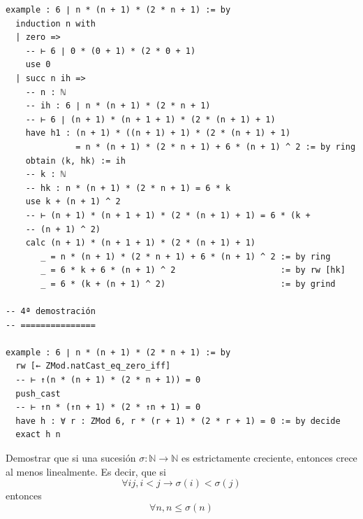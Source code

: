 \begin{verbatim}
example : 6 ∣ n * (n + 1) * (2 * n + 1) := by
  induction n with
  | zero =>
    -- ⊢ 6 ∣ 0 * (0 + 1) * (2 * 0 + 1)
    use 0
  | succ n ih =>
    -- n : ℕ
    -- ih : 6 ∣ n * (n + 1) * (2 * n + 1)
    -- ⊢ 6 ∣ (n + 1) * (n + 1 + 1) * (2 * (n + 1) + 1)
    have h1 : (n + 1) * ((n + 1) + 1) * (2 * (n + 1) + 1)
              = n * (n + 1) * (2 * n + 1) + 6 * (n + 1) ^ 2 := by ring
    obtain ⟨k, hk⟩ := ih
    -- k : ℕ
    -- hk : n * (n + 1) * (2 * n + 1) = 6 * k
    use k + (n + 1) ^ 2
    -- ⊢ (n + 1) * (n + 1 + 1) * (2 * (n + 1) + 1) = 6 * (k +
    -- (n + 1) ^ 2)
    calc (n + 1) * (n + 1 + 1) * (2 * (n + 1) + 1)
       _ = n * (n + 1) * (2 * n + 1) + 6 * (n + 1) ^ 2 := by ring
       _ = 6 * k + 6 * (n + 1) ^ 2                     := by rw [hk]
       _ = 6 * (k + (n + 1) ^ 2)                       := by grind

-- 4ª demostración
-- ===============

example : 6 ∣ n * (n + 1) * (2 * n + 1) := by
  rw [← ZMod.natCast_eq_zero_iff]
  -- ⊢ ↑(n * (n + 1) * (2 * n + 1)) = 0
  push_cast
  -- ⊢ ↑n * (↑n + 1) * (2 * ↑n + 1) = 0
  have h : ∀ r : ZMod 6, r * (r + 1) * (2 * r + 1) = 0 := by decide
  exact h n
\end{verbatim}

\begin{ejercicio}
  Demostrar que si una sucesión \(σ : ℕ → ℕ\) es estrictamente
  creciente, entonces crece al menos linealmente. Es decir,
  que si
  \[ ∀ i j, i < j → σ(i) < σ(j) \]
  entonces
  \[ ∀ n, n ≤ σ(n) \]
\end{ejercicio}

